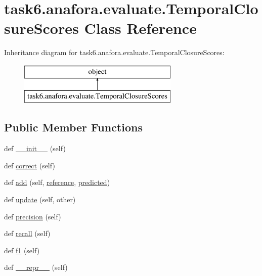 \hypertarget{classtask6_1_1anafora_1_1evaluate_1_1TemporalClosureScores}{}\section{task6.\+anafora.\+evaluate.\+Temporal\+Closure\+Scores Class Reference}
\label{classtask6_1_1anafora_1_1evaluate_1_1TemporalClosureScores}
Inheritance diagram for task6.\+anafora.\+evaluate.\+Temporal\+Closure\+Scores\+:\begin{figure}[H]
\begin{center}
\leavevmode
\includegraphics[height=2.000000cm]{classtask6_1_1anafora_1_1evaluate_1_1TemporalClosureScores}
\end{center}
\end{figure}
\subsection*{Public Member Functions}
\begin{DoxyCompactItemize}
\item 
def \hyperlink{classtask6_1_1anafora_1_1evaluate_1_1TemporalClosureScores_a4327a6108863bdd09878d965f73c3cad}{\+\_\+\+\_\+init\+\_\+\+\_\+} (self)
\item 
def \hyperlink{classtask6_1_1anafora_1_1evaluate_1_1TemporalClosureScores_ad42a293f07a82ed38678649b235a4ee4}{correct} (self)
\item 
def \hyperlink{classtask6_1_1anafora_1_1evaluate_1_1TemporalClosureScores_a17ebd5b34fed8a341880ddb77760037b}{add} (self, \hyperlink{classtask6_1_1anafora_1_1evaluate_1_1TemporalClosureScores_a8192811ddbab1e7abaab6e0f2505c331}{reference}, \hyperlink{classtask6_1_1anafora_1_1evaluate_1_1TemporalClosureScores_a3bef24daaf47a04551bed9a53c4177c3}{predicted})
\item 
def \hyperlink{classtask6_1_1anafora_1_1evaluate_1_1TemporalClosureScores_a5065effd127254288703b33a51516a70}{update} (self, other)
\item 
def \hyperlink{classtask6_1_1anafora_1_1evaluate_1_1TemporalClosureScores_a62ad6182e25405a61b797bf2d974ba50}{precision} (self)
\item 
def \hyperlink{classtask6_1_1anafora_1_1evaluate_1_1TemporalClosureScores_a1bf406369fb91122242ff11d27252d1f}{recall} (self)
\item 
def \hyperlink{classtask6_1_1anafora_1_1evaluate_1_1TemporalClosureScores_ad6622c99cadd3fcd067f39ea3068467c}{f1} (self)
\item 
def \hyperlink{classtask6_1_1anafora_1_1evaluate_1_1TemporalClosureScores_a7b38fd0d0f5b5d3a8905285d1ca6465e}{\+\_\+\+\_\+repr\+\_\+\+\_\+} (self)
\end{DoxyCompactItemize}
